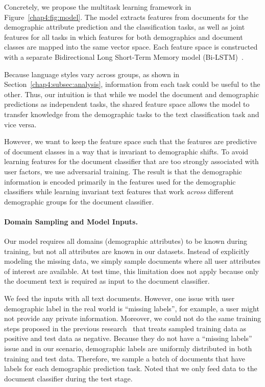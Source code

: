 Concretely, we propose the multitask learning framework in Figure~\ref{chap4:fig:model}. 
The model extracts features from documents for the demographic attribute prediction and the classification tasks, as well as joint features for all tasks in which features for both demographics and document classes are mapped into the same vector space.
Each feature space is constructed with a separate Bidirectional Long Short-Term Memory model (Bi-LSTM)~\cite{hochreiter1997long}.

Because language styles vary across groups, as shown in Section~\ref{chap4:subsec:analysis}, information from each task could be useful to the other.
Thus, our intuition is that while we model the document and demographic predictions as independent tasks, the shared feature space allows the model to transfer knowledge from the demographic tasks to the text classification task and vice versa. 

However, we want to keep the feature space such that the features are predictive of document classes in a way that is invariant to demographic shifts. 
To avoid learning features for the document classifier that are too strongly associated with user factors, 
we use adversarial training.
The result is that the demographic information is encoded primarily in the features used for the demographic classifiers while learning invariant text features that work {\em across} different demographic groups for the document classifier. 

\paragraph{Domain Sampling and Model Inputs.} 
Our model requires all domains (demographic attributes) to be known during training, but not all attributes are known in our datasets.
Instead of explicitly modeling the missing data,
we simply sample documents where all user attributes of interest are available.
At test time, this limitation does not apply because only the document text is required as input to the document classifier.

We feed the inputs with all text documents. However, one issue with user demographic label in the real world is ``missing labels'', for example, a user might not provide any private information. Moreover, we could not do the same training steps proposed in the previous research~\cite{chen2016adversarial} that treats sampled training data as positive and test data as negative. Because they do not have a ``missing labels'' issue and in our scenario, demographic labels are uniformly distributed in both training and test data. Therefore, we sample a batch of documents that have labels for each demographic prediction task. Noted that we only feed data to the document classifier during the test stage.

